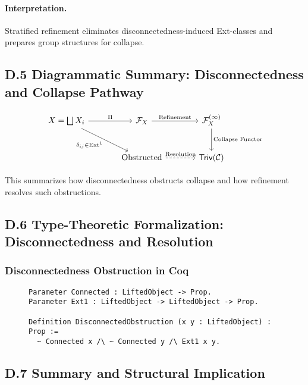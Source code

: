 \documentclass[11pt]{article}
\begin{document}
\paragraph{Interpretation.}
Stratified refinement eliminates disconnectedness-induced Ext-classes and prepares group structures for collapse.

\subsection*{D.5 Diagrammatic Summary: Disconnectedness and Collapse Pathway}

\[
\begin{tikzcd}[column sep=large, row sep=large]
X = \bigsqcup X_i \arrow[r, "\Pi"] \arrow[dr, "\delta_{ij} \in \mathrm{Ext}^1"']
& \mathcal{F}_X \arrow[r, "\mathrm{Refinement}"]
& \mathcal{F}_X^{(\infty)} \arrow[d, "\text{Collapse Functor}"] \\
& \text{Obstructed} \arrow[r, dashed, "\text{Resolution}"]
& \mathsf{Triv}(\mathcal{C})
\end{tikzcd}
\]

This summarizes how disconnectedness obstructs collapse and how refinement resolves such obstructions.

\subsection*{D.6 Type-Theoretic Formalization: Disconnectedness and Resolution}

\subsubsection*{Disconnectedness Obstruction in Coq}

\begin{figure}[h]
\centering
\begin{lstlisting}[language=Coq, caption=Disconnectedness Obstruction Predicate]
Parameter Connected : LiftedObject -> Prop.
Parameter Ext1 : LiftedObject -> LiftedObject -> Prop.

Definition DisconnectedObstruction (x y : LiftedObject) : Prop :=
  ~ Connected x /\ ~ Connected y /\ Ext1 x y.
\end{lstlisting}
\end{figure}

\subsection*{D.7 Summary and Structural Implication}
\end{document}
